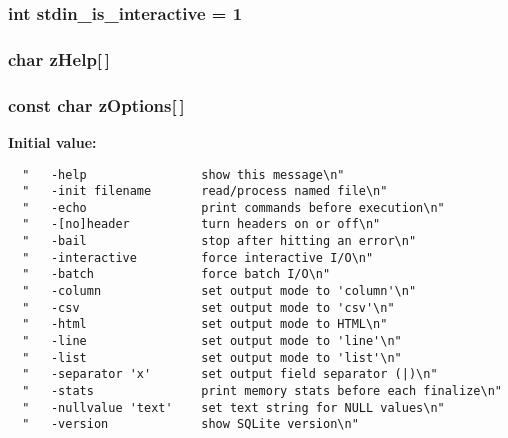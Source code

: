 \subsubsection{\setlength{\rightskip}{0pt plus 5cm}int \bf{stdin\_\-is\_\-interactive} = 1\hspace{0.3cm}{\tt  [static]}}\label{3_87_83_2shell_8c_29e4d240d9b9770ed5f9a20b6ad4bda5}


\subsubsection{\setlength{\rightskip}{0pt plus 5cm}char \bf{z\-Help}[$\,$]\hspace{0.3cm}{\tt  [static]}}\label{3_87_83_2shell_8c_0300e505aaddc75b284cc62c242bbea6}


\subsubsection{\setlength{\rightskip}{0pt plus 5cm}const char \bf{z\-Options}[$\,$]\hspace{0.3cm}{\tt  [static]}}\label{3_87_83_2shell_8c_33eb6a9f186fcc8f1a2ad7b8feda4e48}


\textbf{Initial value:}

\begin{Code}\begin{verbatim} 
  "   -help                show this message\n"
  "   -init filename       read/process named file\n"
  "   -echo                print commands before execution\n"
  "   -[no]header          turn headers on or off\n"
  "   -bail                stop after hitting an error\n"
  "   -interactive         force interactive I/O\n"
  "   -batch               force batch I/O\n"
  "   -column              set output mode to 'column'\n"
  "   -csv                 set output mode to 'csv'\n"
  "   -html                set output mode to HTML\n"
  "   -line                set output mode to 'line'\n"
  "   -list                set output mode to 'list'\n"
  "   -separator 'x'       set output field separator (|)\n"
  "   -stats               print memory stats before each finalize\n"
  "   -nullvalue 'text'    set text string for NULL values\n"
  "   -version             show SQLite version\n"
\end{verbatim}\end{Code}
